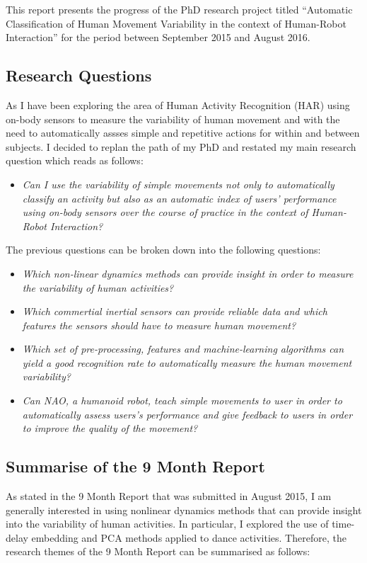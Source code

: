 \documentclass[9pt,journal,onecolumn,compsoc]{IEEEtran}
\begin{document}


This report presents the progress of the PhD research project titled
``Automatic Classification of Human Movement Variability in the context of Human-Robot Interaction'' 
for the period between September 2015 and August 2016.


\subsection{Research Questions}
As 
I have been exploring the area of Human Activity Recognition (HAR)
using on-body sensors to measure the variability of human movement 
and 
with the need to automatically assses simple and repetitive actions 
for within and between subjects.
I decided to replan the path of my PhD and restated my main research question which reads as follows:
\begin{itemize}
 \item \textit{Can I use the variability of simple movements not only to automatically classify
an activity but also as an automatic index of users' performance using on-body sensors 
over the course of practice in the context
of Human-Robot Interaction?}
\end{itemize}
The previous questions can be broken down into the following questions:
\begin{itemize}
 \item \textit{Which non-linear dynamics  methods can provide insight in order to measure the variability of human activities?}
 \item \textit{Which commertial inertial sensors can provide reliable data 
 and which features the sensors should have to measure human movement?}
 \item \textit{Which set of pre-processing, features and machine-learning algorithms 
  can yield a good recognition rate to automatically measure the human movement variability?}
 \item \textit{Can NAO, a humanoid robot, teach simple movements to user
 in order to automatically assess users's performance and give feedback 
 to users in order to improve the quality of the movement?}
\end{itemize}

\subsection{Summarise of the 9 Month Report}
As stated in the 9 Month Report that was submitted in August 2015,
I am generally interested in using nonlinear dynamics methods 
that can provide insight into the variability of human activities.
In particular, I explored the use of time-delay embedding and PCA methods
applied to dance activities. Therefore, the research themes of the 9 Month Report can be summarised as follows:
\end{document}

